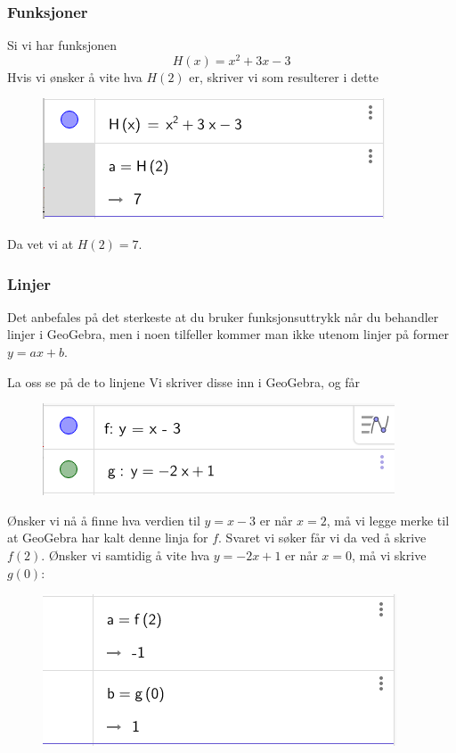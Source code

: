 \subsubsection{Funksjoner}
Si vi har funksjonen
\[H(x)= x^2 + 3x -3 \]
Hvis vi ønsker å vite hva $ H(2) $ er, skriver vi
som resulterer i dette
\begin{figure}[H]
	\centering
	\includegraphics[scale=0.5]{H}
\end{figure}
Da vet vi at $ H(2)=7 $.
\subsubsection{Linjer}
Det anbefales på det sterkeste at du bruker funksjonsuttrykk når du behandler linjer i GeoGebra, men i noen tilfeller kommer man ikke utenom linjer på former $ y=ax+b $. \vsk

La oss se på de to linjene \vs
{}
Vi skriver disse inn i GeoGebra, og får
\begin{figure}[H]
	\centering
	\includegraphics[scale=0.5]{fglin1}
\end{figure}
Ønsker vi nå å finne hva verdien til $ {y=x-3} $ er når $ {x=2} $, må vi legge merke til at GeoGebra har kalt denne linja for $ f $. Svaret vi søker får vi da ved å skrive $ f(2) $. Ønsker vi samtidig å vite hva $ {y=-2x+1} $ er når $ {x=0} $, må vi skrive $ g(0) $:
\begin{figure}[H]
	\centering
	\includegraphics[scale=0.6]{fglin2}
\end{figure}

